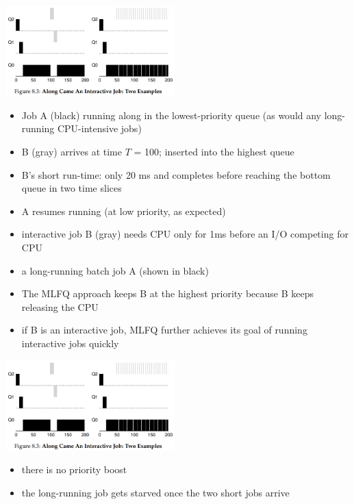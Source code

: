 \includegraphics[width=\linewidth,height=3.5cm]{imgs/sched_long2}
\begin{minipage}{.5\linewidth}
  \flushleft
  \begin{itemize}
  \item  Job A (black) running along in the lowest-priority queue (as would any long-running CPU-intensive jobs)
  \item B (gray) arrives at time $T$ = 100; inserted into the highest queue
  \item B's short run-time: only 20 ms and completes before reaching the bottom queue in two time slices
  \item A resumes running (at low priority, as expected)
  \end{itemize}
\end{minipage}
\begin{minipage}{.5\linewidth}
  \flushleft
  \begin{itemize}
  \item interactive job B (gray) needs CPU only for 1ms before an I/O competing for CPU
  \item a long-running batch job A (shown in black)
  \item The MLFQ approach keeps B at the highest priority because B keeps releasing the CPU
  \item if B is an interactive job, MLFQ further achieves its goal of running interactive jobs quickly
  \end{itemize}
\end{minipage}
\includegraphics[width=\linewidth,height=3.5cm]{imgs/sched_long2}
\begin{minipage}{.5\linewidth}
  \flushleft
  \begin{itemize}
  \item there is no priority boost
  \item the long-running job gets starved once the two short jobs arrive
  \end{itemize}
\end{minipage}
